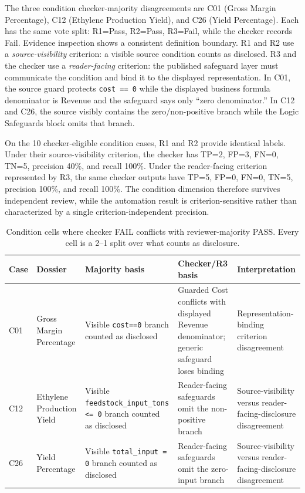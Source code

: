 \documentclass[a4paper,fleqn]{cas-dc}
\begin{document}
The three condition checker-majority disagreements are C01 (Gross Margin Percentage), C12 (Ethylene Production Yield), and C26 (Yield Percentage). Each has the same vote split: R1=Pass, R2=Pass, R3=Fail, while the checker records Fail. Evidence inspection shows a consistent definition boundary. R1 and R2 use a \emph{source-visibility} criterion: a visible source condition counts as disclosed. R3 and the checker use a \emph{reader-facing} criterion: the published safeguard layer must communicate the condition and bind it to the displayed representation. In C01, the source guard protects \texttt{cost == 0} while the displayed business formula denominator is Revenue and the safeguard says only ``zero denominator.'' In C12 and C26, the source visibly contains the zero/non-positive branch while the Logic Safeguards block omits that branch.

On the 10 checker-eligible condition cases, R1 and R2 provide identical labels. Under their source-visibility criterion, the checker has TP=2, FP=3, FN=0, TN=5, precision 40\%, and recall 100\%. Under the reader-facing criterion represented by R3, the same checker outputs have TP=5, FP=0, FN=0, TN=5, precision 100\%, and recall 100\%. The condition dimension therefore survives independent review, while the automation result is criterion-sensitive rather than characterized by a single criterion-independent precision.

\begin{table}[t]
\centering
\caption{Condition cells where checker FAIL conflicts with reviewer-majority PASS. Every cell is a 2--1 split over what counts as disclosure.}
\label{tab:condition_disagreement}
\begin{tabularx}{\textwidth}{@{}llYYY@{}}
\toprule
Case & Dossier & Majority basis & Checker/R3 basis & Interpretation \\
\midrule
C01 & Gross Margin Percentage & Visible \texttt{cost==0} branch counted as disclosed & Guarded Cost conflicts with displayed Revenue denominator; generic safeguard loses binding & Representation-binding criterion disagreement \\
C12 & Ethylene Production Yield & Visible \texttt{feedstock\_input\_tons <= 0} branch counted as disclosed & Reader-facing safeguards omit the non-positive branch & Source-visibility versus reader-facing-disclosure disagreement \\
C26 & Yield Percentage & Visible \texttt{total\_input = 0} branch counted as disclosed & Reader-facing safeguards omit the zero-input branch & Source-visibility versus reader-facing-disclosure disagreement \\
\bottomrule
\end{tabularx}
\end{table}
\end{document}
